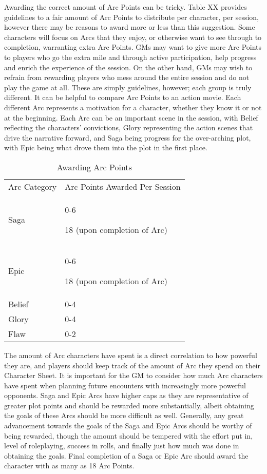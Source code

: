 \documentclass[oneside,11pt,english]{book}
\begin{document}
Awarding the correct amount of Arc Points can be tricky. Table XX provides guidelines to a fair amount 
of Arc Points to distribute per character, per session, however there may be reasons to award more or less 
than this suggestion. Some characters will focus on Arcs that they enjoy, or otherwise want to see through 
to completion, warranting extra Arc Points. GMs may want to give more Arc Points to players who go the 
extra mile and through active participation, help progress and enrich the experience of the session. On the 
other hand, GMs may wish to refrain from rewarding players who mess around the entire session and do 
not play the game at all. These are simply guidelines, however; each group is truly different. 
It can be helpful to compare Arc Points to an action movie. Each different Arc represents a motivation for 
a character, whether they know it or not at the beginning. Each Arc can be an important scene in the 
session, with Belief reflecting the characters’ convictions, Glory representing the action scenes that drive 
the narrative forward, and Saga being progress for the over-arching plot, with Epic being what drove them 
into the plot in the first place. 

\begin{table}
	\caption{Awarding Arc Points}
	\label{tab:AwardingArcPoints}
		\begin{tabu} spread 0pt {| X[c,m]X[l,m] |}\toprule %
Arc Category&Arc Points Awarded Per Session \\
	Saga&0-6 

	18 (upon completion of Arc)\\\cmidrule(r){1-2}
	Epic&0-6

	18 (upon completion of Arc)\\\cmidrule(r){1-2}
Belief&0-4\\\cmidrule(r){1-2}
Glory&0-4\\\cmidrule(r){1-2}
Flaw&0-2\\\bottomrule
		\end{tabu} 
\end{table}
 
The amount of Arc characters have spent is a direct correlation to how powerful they are, and players 
should keep track of the amount of Arc they spend on their Character Sheet. It is important for the GM to 
consider how much Arc characters have spent when planning future encounters with increasingly more 
powerful opponents. 
Saga and Epic Arcs have higher caps as they are representative of greater plot points and should be 
rewarded more substantially, albeit obtaining the goals of these Arcs should be more difficult as well. 
Generally, any great advancement towards the goals of the Saga and Epic Arcs should be worthy of being 
rewarded, though the amount should be tempered with the effort put in, level of roleplaying, success in 
rolls, and finally just how much was done in obtaining the goals. Final completion of a Saga or Epic Arc 
should award the character with as many as 18 Arc Points. 
\end{document}
